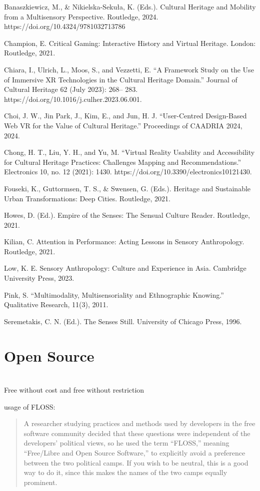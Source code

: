 Banaszkiewicz, M., & Nikielska-Sekuła, K. (Eds.). Cultural Heritage and Mobility from a
Multisensory Perspective. Routledge, 2024. https://doi.org/10.4324/9781032713786

Champion, E. Critical Gaming: Interactive History and Virtual Heritage. London: Routledge, 2021.

Chiara, I., Ulrich, L., Moos, S., and Vezzetti, E. “A Framework Study on the Use of Immersive XR
Technologies in the Cultural Heritage Domain.” Journal of Cultural Heritage 62 (July 2023): 268–
283. https://doi.org/10.1016/j.culher.2023.06.001.

Choi, J. W., Jin Park, J., Kim, E., and Jun, H. J. “User-Centred Design-Based Web VR for the Value of
Cultural Heritage.” Proceedings of CAADRIA 2024, 2024.

Chong, H. T., Liu, Y. H., and Yu, M. “Virtual Reality Usability and Accessibility for Cultural Heritage
Practices: Challenges Mapping and Recommendations.” Electronics 10, no. 12 (2021): 1430.
https://doi.org/10.3390/electronics10121430.

Fouseki, K., Guttormsen, T. S., & Swensen, G. (Eds.). Heritage and Sustainable Urban
Transformations: Deep Cities. Routledge, 2021.

Howes, D. (Ed.). Empire of the Senses: The Sensual Culture Reader. Routledge, 2021.

Kilian, C. Attention in Performance: Acting Lessons in Sensory Anthropology. Routledge, 2021.

Low, K. E. Sensory Anthropology: Culture and Experience in Asia. Cambridge University Press,
2023.

Pink, S. “Multimodality, Multisensoriality and Ethnographic Knowing.” Qualitative Research, 11(3),
2011.

Seremetakis, C. N. (Ed.). The Senses Still. University of Chicago Press, 1996.


\section{Open Source}

\section{\cite{stallman_floss_2021}}

Free without cost and free without restriction

usage of FLOSS:
\begin{quotation}
    A researcher studying practices and methods used by developers in the free software community decided that these questions were independent of the developers' political views, so he used the term “FLOSS,” meaning “Free/Libre and Open Source Software,” to explicitly avoid a preference between the two political camps. If you wish to be neutral, this is a good way to do it, since this makes the names of the two camps equally prominent.
\end{quotation}



